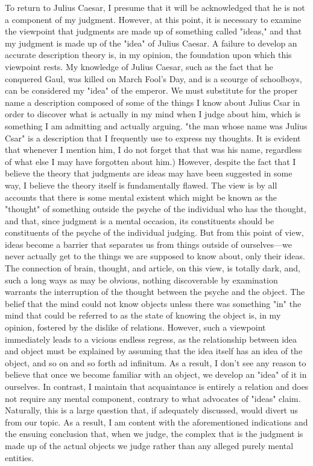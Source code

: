 \documentclass[a4paper,12pt]{book}[2004/02/16]
\theoremstyle{ilemma}
\theoremstyle{itheorem}
\theoremstyle{iother}
\theoremstyle{icorollary}
\theoremstyle{numcorollary}
\theoremstyle{idefinition}
\begin{document}
To return to Julius Caesar, I presume that it will be acknowledged that he is not a component of my judgment. However, at this point, it is necessary to examine the viewpoint that judgments are made up of something called "ideas," and that my judgment is made up of the "idea" of Julius Caesar. A failure to develop an accurate description theory is, in my opinion, the foundation upon which this viewpoint rests. My knowledge of Julius Caesar, such as the fact that he conquered Gaul, was killed on March Fool's Day, and is a scourge of schoolboys, can be considered my "idea" of the emperor. We must substitute for the proper name a description composed of some of the things I know about Julius Csar in order to discover what is actually in my mind when I judge about him, which is something I am admitting and actually arguing. "the man whose name was Julius Csar" is a description that I frequently use to express my thoughts. It is evident that whenever I mention him, I do not forget that that was his name, regardless of what else I may have forgotten about him.) However, despite the fact that I believe the theory that judgments are ideas may have been suggested in some way, I believe the theory itself is fundamentally flawed. The view is by all accounts that there is some
mental existent which might be known as the "thought" of something outside
the psyche of the individual who has the thought, and that, since judgment is a
mental occasion, its constituents should be constituents of the psyche of the
individual judging. But from this point of view, ideas become a barrier that separates us from things outside of ourselves—we never actually get to the things we are supposed to know about, only their ideas. The connection of brain, thought, and article, on this view, is
totally dark, and, such a long ways as may be obvious, nothing discoverable by
examination warrants the interruption of the thought between the psyche and the
object. The belief that the mind could not know objects unless there was something "in" the mind that could be referred to as the state of knowing the object is, in my opinion, fostered by the dislike of relations. However, such a viewpoint immediately leads to a vicious endless regress, as the relationship between idea and object must be explained by assuming that the idea itself has an idea of the object, and so on and so forth ad infinitum. As a result, I don't see any reason to believe that once we become familiar with an object, we develop an "idea" of it in ourselves. In contrast, I maintain that acquaintance is entirely a relation and does not require any mental component, contrary to what advocates of "ideas" claim. Naturally, this is a large question that, if adequately discussed, would divert us from our topic. As a result, I am content with the aforementioned indications and the ensuing conclusion that, when we judge, the complex that is the judgment is made up of the actual objects we judge rather than any alleged purely mental entities.
\end{document}
